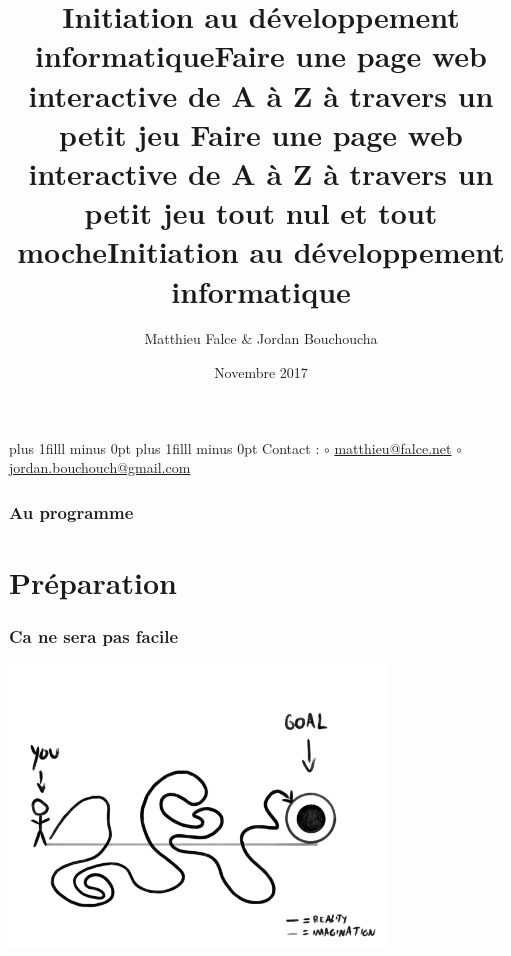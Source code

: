 \documentclass{beamer}
\title{Initiation au développement informatique}
\author{Matthieu Falce \& Jordan Bouchoucha}
\institute{Association des Bidouilleurs Libristes}
\date{Novembre 2017}
\def\vfilll{\vskip 0pt plus 1filll minus 0pt }
\begin{document}
    \vfilll
    \titlepage
    \vfilll
     Contact : \linebreak 
    	\phantom{pasvu} $\circ$ \url{matthieu@falce.net} \linebreak 
    	\phantom{pasvu} $\circ$ \url{jordan.bouchouch@gmail.com}


    \title{Faire une page web interactive de A à Z à travers un petit jeu }
    \begin{frame}
    \maketitle
    \end{frame}

    \title{Faire une page web interactive de A à Z à travers un petit jeu \linebreak \small{tout nul et tout moche}}
    \begin{frame}
    \maketitle
    \end{frame}
    
    \title{Initiation au développement informatique}

   \begin{frame}
        \frametitle{Au programme}
        \tableofcontents
   \end{frame}

    \section{Préparation}

    \begin{frame}
		\frametitle{Ca ne sera pas facile}
		\centering \includegraphics[width=10cm]{images/goals_imagination_reality.png} 
    \end{frame}
\end{document}
